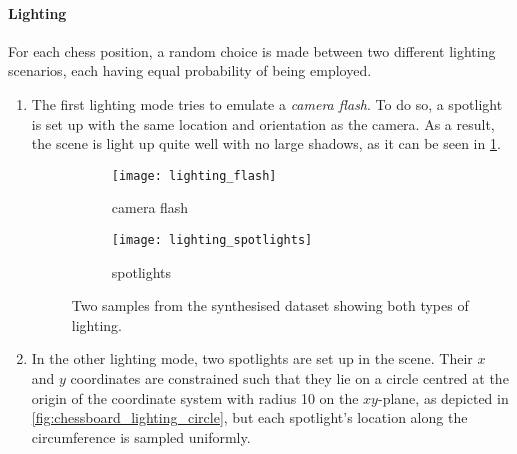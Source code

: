 \paragraph{Lighting}
For each chess position, a random choice is made between two different lighting scenarios, each having equal probability of being employed.
\begin{enumerate}
    \item The first lighting mode tries to emulate a \emph{camera flash}.
        To do so, a spotlight is set up with the same location and orientation as the camera. 
        As a result, the scene is light up quite well with no large shadows, as it can be seen in \cref{fig:lighting_flash_example}.
        \begin{figure}
            \centering
            \begin{subfigure}[b]{0.47\textwidth}
                \centering
                \texttt{[image: lighting\_flash]}
                \caption{camera flash}
                \label{fig:lighting_flash_example}
            \end{subfigure}
            \hfill
            \begin{subfigure}[b]{0.47\textwidth}
                \centering
                \texttt{[image: lighting\_spotlights]}
                \caption{spotlights}
                \label{fig:lighting_spotlights_example}
            \end{subfigure}
            \caption{Two samples from the synthesised dataset showing both types of lighting.}
            \label{fig:lighting_examples}
        \end{figure}
    \item In the other lighting mode, two spotlights are set up in the scene. 
        Their $x$ and $y$ coordinates are constrained such that they lie on a circle centred at the origin of the coordinate system with radius 10 on the $xy$-plane, as depicted in \cref{fig:chessboard_lighting_circle}, but each spotlight's location along the circumference is sampled uniformly.
        \begin{figure}
            \centering
\end{figure}
\end{enumerate}
